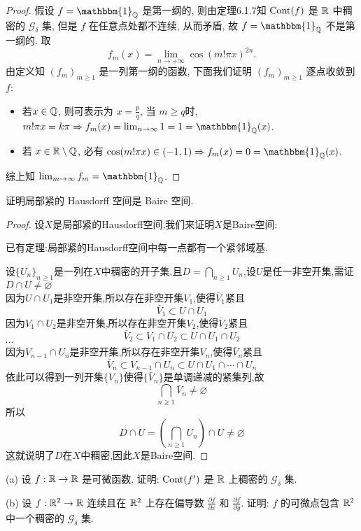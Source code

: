\begin{proof}
    假设 $f=\mathbbm{1}_{\FQ}$ 是第一纲的, 则由定理6.1.7知 $\mathrm{Cont}(f)$ 是
    $\mathbb{R}$ 中稠密的 $\mathcal{G}_{\delta}$ 集, 但是 $f$ 在任意点处都不连续, 
    从而矛盾, 故 $f=\mathbbm{1}_{\FQ}$ 不是第一纲的. 取
    \[f_m(x)=\lim_{n\to+\infty}\cos(m!\pi x)^{2n}.\]
    由定义知 $(f_m)_{m\geq 1}$ 是一列第一纲的函数, 下面我们证明 $(f_m)_{m\geq 1}$ 逐点收敛到 $f$:
    \begin{itemize}
    \item 若$x\in\mathbb{Q}$, 则可表示为 $x=\frac{p}{q}$, 当 $m\geq q$时,
          $m!\pi x=k\pi\Rightarrow f_m(x)=\lim_{n\to\infty}1=1=\mathbbm{1}_{\FQ}(x)$.
    \item 若 $x\in\mathbb{R}\setminus\mathbb{Q}$, 必有 $\cos(m!\pi x)\in(-1,1)\Rightarrow f_m(x)=0=\mathbbm{1}_{\FQ}(x)$.
    \end{itemize}
    综上知 $\lim_{m\to\infty}f_m=\mathbbm{1}_{\FQ}$.
\end{proof}



\begin{exercise}
    证明局部紧的 Hausdorff 空间是 Baire 空间.
\end{exercise}

\begin{proof}
设$X$是局部紧的Hausdorff空间,我们来证明$X$是Baire空间:

已有定理:局部紧的Hausdorff空间中每一点都有一个紧邻域基.

设$\{U_n\}_{n\geq 1}$是一列在$X$中稠密的开子集,且$D=\bigcap_{n\geq 1}U_n$,设$U$是任一非空开集,需证$D\cap U\neq\varnothing$\\
因为$U\cap U_1$是非空开集,所以存在非空开集$V_1$,使得$\bar{V}_1$紧且\[\bar{V}_1\subset U\cap U_1\]
因为$V_1\cap U_2$是非空开集,所以存在非空开集$V_2$,使得$\bar{V}_2$紧且\[\bar{V}_2\subset V_1\cap U_2\subset U\cap U_1\cap U_2\]
$\cdots$\\
因为$V_{n-1}\cap U_n$是非空开集,所以存在非空开集$V_n$,使得$\bar{V}_n$紧且\[\bar{V}_n\subset V_{n-1}\cap U_n\subset U\cap U_1\cap\cdots\cap U_n\]
依此可以得到一列开集$\{V_n\}$使得$\{\bar{V}_n\}$是单调递减的紧集列,故\[\bigcap_{n\geq 1}\bar{V}_n\neq\varnothing\]
所以\[D\cap U=\left(\bigcap_{n\geq 1}U_n\right)\cap U\neq\varnothing\]这就说明了$D$在$X$中稠密,因此$X$是Baire空间.
\end{proof}



\begin{exercise}
    (a) 设 $f:\mathbb{R}\to\mathbb{R}$ 是可微函数. 证明: $\mathrm{Cont}(f')$ 是 $\mathbb{R}$ 上稠密的 $\mathcal{G}_{\delta}$ 集.

    (b) 设 $f:\mathbb{R}^2\to\mathbb{R}$ 连续且在 $\mathbb{R}^2$ 上存在偏导数 $\frac{\partial f}{\partial x}$ 和 $\frac{\partial f}{\partial y}$.
    证明: $f$ 的可微点包含 $\mathbb{R}^2$ 中一个稠密的 $\mathcal{G}_{\delta}$ 集.
\end{exercise}

